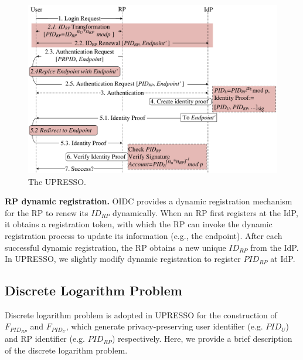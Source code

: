\begin{figure}[t]
  \centering
  \includegraphics[width=\linewidth]{fig/overview1.pdf}
  \caption{The UPRESSO.}
  \label{fig:UPRESSO}
\end{figure}

\noindent\textbf{RP dynamic registration.} OIDC provides a dynamic registration mechanism~\cite{DynamicRegistration} for the RP to renew its $ID_{RP}$ dynamically. %
When an RP first registers at the IdP, it obtains a registration token, with which the  RP can invoke the dynamic registration process to
update its information (e.g., the endpoint). %
After each successful dynamic registration, the RP obtains a new unique $ID_{RP}$ from the IdP.
In UPRESSO, we slightly modify dynamic registration to register $PID_{RP}$ at IdP. 


\subsection{Discrete Logarithm Problem}
\label{sec:dlp}
Discrete logarithm problem is adopted in UPRESSO for the construction of $F_{PID_{RP}}$ and $F_{PID_U}$,
 which generate privacy-preserving user identifier (e.g. $PID_U$) and RP identifier (e.g. $PID_{RP}$) respectively.
Here, we provide a brief description of the discrete logarithm problem.

